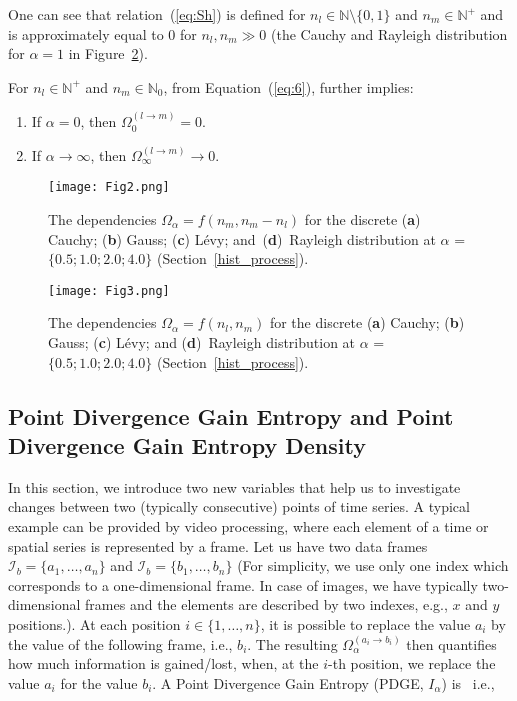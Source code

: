 \documentclass[entropy,article,accept,moreauthors,pdftex,10pt,a4paper]{mdpi}
\begin{document}
One can see that relation~(\ref{eq:Sh}) is defined for $n_l \in \mathbb{N}\setminus\{0,1\}$ and $n_m \in \mathbb{N}^+$ and is approximately equal to 0 for $n_l, n_m \gg 0$ (the Cauchy and Rayleigh distribution for $\alpha = 1$ in {Figure}~\ref{Fig3}).

For $n_l \in \mathbb{N}^+$ and $n_m \in \mathbb{N}_0$, from Equation~(\ref{eq:6}), further implies:
\begin{enumerate}[leftmargin=*,labelsep=4.9mm]
\item   If $\alpha = 0$, then $\Omega_0^{(l \rightarrow m)} = 0$.
\item   If $\alpha \rightarrow \infty$, then $\Omega_{\infty}^{(l \rightarrow m)} \rightarrow 0$.
\end{enumerate}

\begin{figure}[H]
\centering
\texttt{[image: Fig2.png]}
\caption[]{{The dependencies} $\Omega_\alpha = f(n_m, n_m-n_l)$ for the discrete (\textbf{a}) Cauchy; (\textbf{b}) Gauss; (\textbf{c}) L\'{e}vy; and~(\textbf{d})~Rayleigh distribution at $\alpha$ = $\{0.5; 1.0; 2.0; 4.0\}$ (Section~\ref{hist_process}).}
\label{Fig2}
\end{figure}

\begin{figure}[H]
\centering
\texttt{[image: Fig3.png]}
\caption[]{{The dependencies} $\Omega_\alpha = f(n_l,n_m)$ for the discrete (\textbf{a}) Cauchy; (\textbf{b}) Gauss; (\textbf{c}) L\'{e}vy; and (\textbf{d})~Rayleigh distribution at $\alpha$ = $\{0.5; 1.0; 2.0; 4.0\}$ (Section~\ref{hist_process}).}
\label{Fig3}
\end{figure}

\subsection{Point Divergence Gain Entropy and Point Divergence Gain Entropy Density}
\label{subsec:entropies}
In this section, we introduce two new variables that help us to investigate changes between two (typically consecutive) points of time series. A typical example can be provided by video processing, where each element of a time or spatial series is represented by a frame. Let us have two data frames $\mathcal{I}_b = \{a_1,\dots,a_n\}$ and $\mathcal{I}_b = \{b_1,\dots,b_n\}$ ({{For simplicity, we use only one index which corresponds} to a one-dimensional frame. In case of images, we have typically two-dimensional frames and the elements are described by two indexes, e.g., $x$ and $y$ positions.}).
At each position $i \in \{1,\dots,n\}$, it is possible to replace the value $a_i$ by the value of the following frame, i.e., $b_i$. The resulting $\Omega_\alpha^{(a_i \rightarrow b_i)}$ then quantifies how much information is gained/lost, when, at the $i$-th position, we replace the value $a_i$ for the value $b_i$. A Point Divergence Gain Entropy (PDGE, $I_\alpha$) is ~i.e.,
\end{document}
